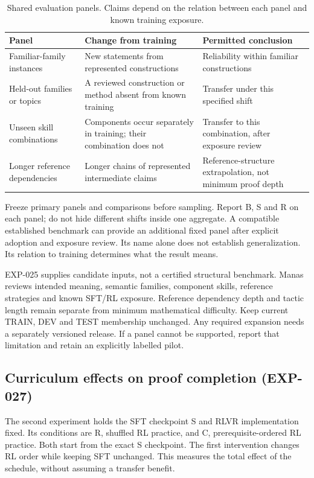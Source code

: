\documentclass[11pt]{article}
\begin{document}
\begin{table}[!htbp]
\centering
\small
\caption{Shared evaluation panels. Claims depend on the relation between each panel and known training exposure.}
\label{tab:generalization-panels}
\begin{tabularx}{\textwidth}{@{}P{3.1cm}YP{4.0cm}@{}}
\toprule
Panel & Change from training & Permitted conclusion \\
\midrule
Familiar-family instances & New statements from represented constructions & Reliability within familiar constructions \\
Held-out families or topics & A reviewed construction or method absent from known training & Transfer under this specified shift \\
Unseen skill combinations & Components occur separately in training; their combination does not & Transfer to this combination, after exposure review \\
Longer reference dependencies & Longer chains of represented intermediate claims & Reference-structure extrapolation, not minimum proof depth \\
\bottomrule
\end{tabularx}
\end{table}

Freeze primary panels and comparisons before sampling.
Report B, S and R on each panel; do not hide different shifts inside one aggregate.
A compatible established benchmark can provide an additional fixed panel after explicit adoption and exposure review.
Its name alone does not establish generalization.
Its relation to training determines what the result means.

EXP-025 supplies candidate inputs, not a certified structural benchmark.
Manas reviews intended meaning, semantic families, component skills, reference strategies and known SFT/RL exposure.
Reference dependency depth and tactic length remain separate from minimum mathematical difficulty.
Keep current TRAIN, DEV and TEST membership unchanged.
Any required expansion needs a separately versioned release.
If a panel cannot be supported, report that limitation and retain an explicitly labelled pilot.

\subsection{Curriculum effects on proof completion (EXP-027)}

The second experiment holds the SFT checkpoint S and RLVR implementation fixed.
Its conditions are R, shuffled RL practice, and C, prerequisite-ordered RL practice.
Both start from the exact S checkpoint.
The first intervention changes RL order while keeping SFT unchanged.
This measures the total effect of the schedule, without assuming a transfer benefit.
\end{document}
